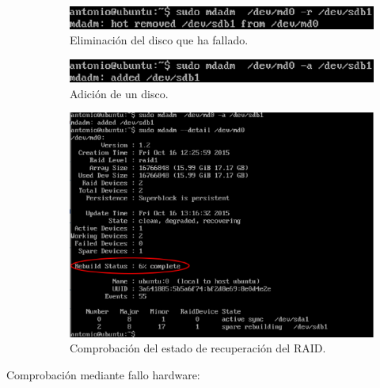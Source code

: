 \begin{description}
            \begin{figure}[H]
                \begin{center}
                    \includegraphics[scale=0.8]{Imagenes/remove.eps}
                    \caption{Eliminación del disco que ha fallado.}
                    \label{fig6}
                \end{center}
            \end{figure}

            \begin{figure}[H]
                \begin{center}
                    \includegraphics[scale=0.8]{Imagenes/add.eps}
                    \caption{Adición de un disco.}
                    \label{fig7}
                \end{center}
            \end{figure}

            \begin{figure}[H]
                \begin{center}
                    \includegraphics[scale=0.5]{Imagenes/estado_recuperacion.eps}
                    \caption{Comprobación del estado de recuperación del RAID.}
                    \label{fig8}
                \end{center}
            \end{figure}
    \item[Comprobación mediante fallo hardware: ]


\end{description}
